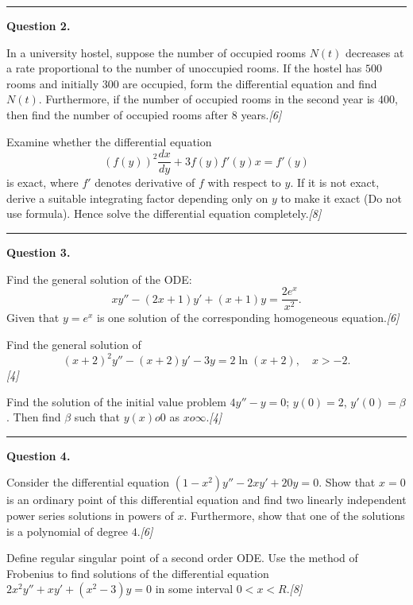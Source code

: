 \documentclass[11pt,a4paper]{article}
\newcommand{\pts}[1]{\hfill   \textit{[#1]}}
\begin{document}
\medskip\rule{\linewidth}{0.2pt}\medskip




\noindent   \textbf{Question 2.}

\begin{parts}
  \item In a university hostel, suppose the number of occupied rooms $N(t)$ decreases at a rate proportional to the number of unoccupied rooms. If the hostel has $500$ rooms and initially $300$ are occupied, form the differential equation and find $N(t)$. Furthermore, if the number of occupied rooms in the second year is $400$, then find the number of occupied rooms after $8$ years.\pts{6}
  \item Examine whether the differential equation
  \[
    (f(y))^2 \frac{dx}{dy} + 3f(y) f'(y) x = f'(y)
  \]
  is exact, where $f'$ denotes derivative of $f$ with respect to $y$. If it is not exact, derive a suitable integrating factor depending only on $y$ to make it exact (Do not use formula). Hence solve the differential equation completely.\pts{8}
\end{parts}

\medskip\rule{\linewidth}{0.2pt}\medskip




\noindent   \textbf{Question 3.}

\begin{parts}
  \item Find the general solution of the ODE:
  \[
    x y'' - (2x + 1) y' + (x + 1) y = \frac{2e^x}{x^2}.
  \]
  Given that $y = e^x$ is one solution of the corresponding homogeneous equation.\pts{6}
  \item
  
\begin{parts}
    \item Find the general solution of
    \[
      (x + 2)^2 y'' - (x + 2) y' - 3y = 2 \ln(x + 2), \quad x > -2.
    \]\pts{4}
    \item Find the solution of the initial value problem $4y'' - y = 0$; $y(0) = 2$, $y'(0) = \beta$. Then find $\beta$ such that $y(x)  o 0$ as $x  o \infty$.\pts{4}
  \end{parts}
\end{parts}

\medskip\rule{\linewidth}{0.2pt}\medskip




\noindent   \textbf{Question 4.}

\begin{parts}
  \item Consider the differential equation $(1 - x^2) y'' - 2xy' + 20y = 0$. Show that $x = 0$ is an ordinary point of this differential equation and find two linearly independent power series solutions in powers of $x$. Furthermore, show that one of the solutions is a polynomial of degree $4$.\pts{6}
  \item Define regular singular point of a second order ODE. Use the method of Frobenius to find solutions of the differential equation $2x^2 y'' + xy' + (x^2 - 3)y = 0$ in some interval $0 < x < R$.\pts{8}
\end{parts}
\end{document}
